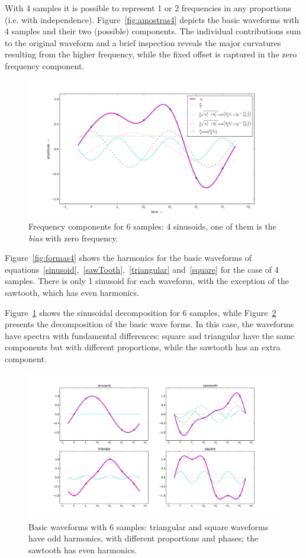 With 4 samples it is possible to represent 1 or 2 frequencies in any proportions (i.e. with independence). Figure~\ref{fig:amostras4} depicts the basic waveforms with 4 samples and their two (possible) components. The individual contributions sum to the original waveform and a brief inspection reveals the major curvatures resulting from the higher frequency, while the fixed offset is captured in the zero frequency component.

\begin{figure}
    \centering
        \includegraphics[width=.7\textwidth]{figures/amostras6_}
    \caption{Frequency components for 6 samples: 4 sinusoids, one of them is the \emph{bias} with zero frequency.}
        \label{fig:amostras6}
\end{figure}

Figure~\ref{fig:formas4} shows the harmonics for the basic waveforms of equations~\ref{sinusoid},~\ref{sawTooth},~\ref{triangular} and~\ref{square} for the case of 4 samples. There is only 1 sinusoid for each waveform, with the exception of the sawtooth, which has even harmonics.

Figure~\ref{fig:amostras6} shows the sinusoidal decomposition for 6 samples, while Figure~\ref{fig:formas6} presents the decomposition of the basic wave forms. In this case, the waveforms have spectra with fundamental differences: square and triangular have the same components but with different proportions, while the sawtooth has an extra component.

\begin{figure}
    \centering
        \includegraphics[width=.9\textwidth]{figures/amostras6formas__}
    \caption{Basic waveforms with 6 samples: triangular and square waveforms have odd harmonics, with different proportions and phases; the sawtooth has even harmonics.}
        \label{fig:formas6}
\end{figure}

